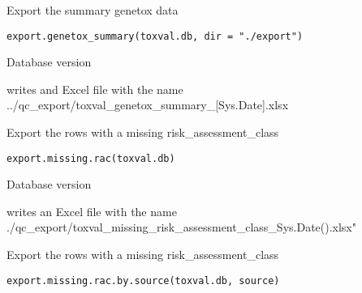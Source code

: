 \documentclass[letterpaper]{book}
\begin{document}
%
\begin{Description}\relax
Export the summary genetox data
\end{Description}
%
\begin{Usage}
\begin{verbatim}
export.genetox_summary(toxval.db, dir = "./export")
\end{verbatim}
\end{Usage}
%
\begin{Arguments}
\begin{ldescription}
\item[\code{toxval.db}] Database version
\end{ldescription}
\end{Arguments}
%
\begin{Value}
writes and Excel file with the name
../qc\_export/toxval\_genetox\_summary\_[Sys.Date].xlsx
\end{Value}
%
\begin{Description}\relax
Export the rows with a missing risk\_assessment\_class
\end{Description}
%
\begin{Usage}
\begin{verbatim}
export.missing.rac(toxval.db)
\end{verbatim}
\end{Usage}
%
\begin{Arguments}
\begin{ldescription}
\item[\code{toxval.db}] Database version
\end{ldescription}
\end{Arguments}
%
\begin{Value}
writes an Excel file with the name
./qc\_export/toxval\_missing\_risk\_assessment\_class\_Sys.Date().xlsx"
\end{Value}
%
\begin{Description}\relax
Export the rows with a missing risk\_assessment\_class
\end{Description}
%
\begin{Usage}
\begin{verbatim}
export.missing.rac.by.source(toxval.db, source)
\end{verbatim}
\end{Usage}
\end{document}
